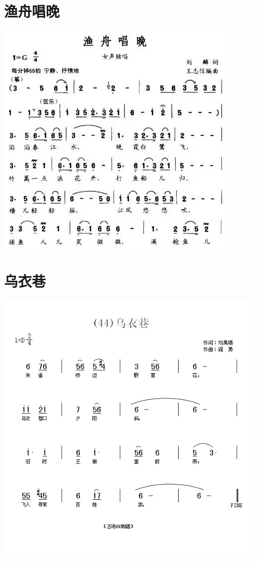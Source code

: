 \documentclass[cn,pad,chinesefont=nofont,twocol]{elegantbook}
\begin{document}
\section{渔舟唱晚}\includegraphics[width=\textwidth]{dongxiao/20200819/渔舟唱晚.jpeg}
\section{乌衣巷}
    \includegraphics[width=\textwidth]{dongxiao/20200808-乌衣巷-刘禹锡.jpg}
\end{document}

